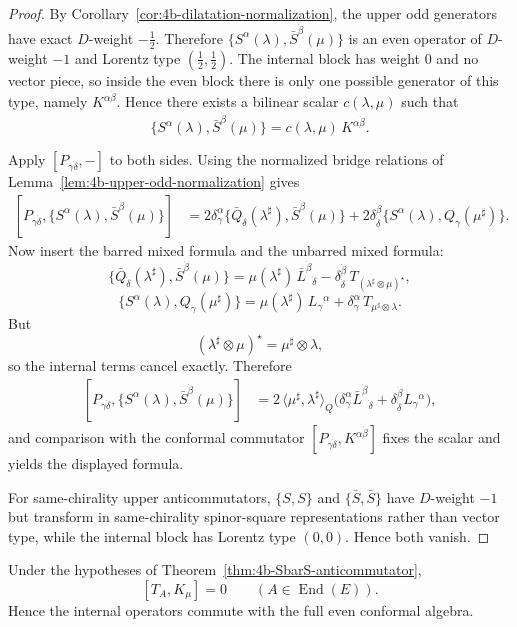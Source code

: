 \begin{proof}
By Corollary~\ref{cor:4b-dilatation-normalization}, the upper odd generators have
exact \(D\)-weight \(-\tfrac12\). Therefore
\(\{S^\alpha(\lambda),\bar S^{\dot\beta}(\mu)\}\) is an even operator of
\(D\)-weight \(-1\) and Lorentz type \((\tfrac12,\tfrac12)\). The internal block
has weight \(0\) and no vector piece, so inside the even block there is only one
possible generator of this type, namely \(K^{\alpha\dot\beta}\). Hence there
exists a bilinear scalar \(c(\lambda,\mu)\) such that
\[
\{S^\alpha(\lambda),\bar S^{\dot\beta}(\mu)\}
=
c(\lambda,\mu)\,K^{\alpha\dot\beta}.
\]

Apply \([P_{\gamma\dot\delta},-]\) to both sides. Using the normalized bridge
relations of Lemma~\ref{lem:4b-upper-odd-normalization} gives
\[
\begin{aligned}
[P_{\gamma\dot\delta},\{S^\alpha(\lambda),\bar S^{\dot\beta}(\mu)\}]
&=
2\delta_\gamma^\alpha
\{\bar Q_{\dot\delta}(\lambda^\sharp),\bar S^{\dot\beta}(\mu)\}
+
2\delta_{\dot\delta}^{\dot\beta}
\{S^\alpha(\lambda),Q_\gamma(\mu^\sharp)\}.
\end{aligned}
\]
Now insert the barred mixed formula and the unbarred mixed formula:
\[
\{\bar Q_{\dot\delta}(\lambda^\sharp),\bar S^{\dot\beta}(\mu)\}
=
\mu(\lambda^\sharp)\,\bar L^{\dot\beta}{}_{\dot\delta}
-\delta_{\dot\delta}^{\dot\beta}\,T_{(\lambda^\sharp\otimes\mu)^\star},
\]
\[
\{S^\alpha(\lambda),Q_\gamma(\mu^\sharp)\}
=
\mu(\lambda^\sharp)\,L_\gamma{}^\alpha
+\delta_\gamma^\alpha\,T_{\mu^\sharp\otimes\lambda}.
\]
But
\[
(\lambda^\sharp\otimes\mu)^\star
=
\mu^\sharp\otimes\lambda,
\]
so the internal terms cancel exactly. Therefore
\[
\begin{aligned}
[P_{\gamma\dot\delta},\{S^\alpha(\lambda),\bar S^{\dot\beta}(\mu)\}]
&=
2\,\langle \mu^\sharp,\lambda^\sharp\rangle_Q
\bigl(
\delta_\gamma^\alpha\bar L^{\dot\beta}{}_{\dot\delta}
+
\delta_{\dot\delta}^{\dot\beta}L_\gamma{}^\alpha
\bigr),
\end{aligned}
\]
and comparison with the conformal commutator
\([P_{\gamma\dot\delta},K^{\alpha\dot\beta}]\) fixes the scalar and yields the
displayed formula.

For same-chirality upper anticommutators, \(\{S,S\}\) and \(\{\bar S,\bar S\}\)
have \(D\)-weight \(-1\) but transform in same-chirality spinor-square
representations rather than vector type, while the internal block has Lorentz
type \((0,0)\). Hence both vanish.
\end{proof}

\begin{corollary}
\label{cor:4b-internal-K-commutation}
Under the hypotheses of Theorem~\ref{thm:4b-SbarS-anticommutator},
\[
[T_A,K_\mu]=0
\qquad
(A\in\operatorname{End}(E)).
\]
Hence the internal operators commute with the full even conformal algebra.
\end{corollary}

